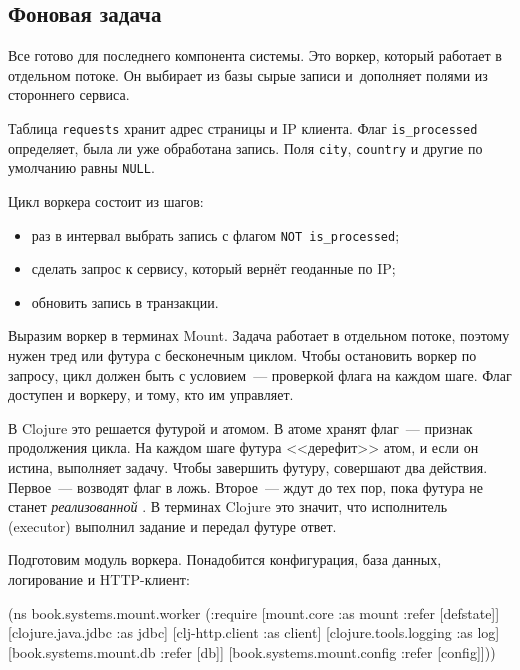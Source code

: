 \subsection{Фоновая задача}

\label{worker}

Все готово для последнего компонента системы. Это воркер, который работает в
отдельном потоке. Он выбирает из базы сырые записи и~дополняет полями из
стороннего сервиса.

Таблица \verb|requests| хранит адрес страницы и IP клиента. Флаг
\verb|is_processed| определяет, была ли уже обработана запись. Поля \verb|city|,
\verb|country| и другие по умолчанию равны \verb|NULL|.


Цикл воркера состоит из шагов:

\begin{itemize}

\item
  раз в интервал выбрать запись с флагом \verb|NOT is_processed|;

\item
  сделать запрос к сервису, который вернёт геоданные по IP;

\item
  обновить запись в транзакции.

\end{itemize}

Выразим воркер в терминах Mount. Задача работает в отдельном потоке, поэтому
нужен тред или футура с бесконечным циклом. Чтобы остановить воркер по запросу,
цикл должен быть с условием~--- проверкой флага на каждом шаге. Флаг доступен и
воркеру, и тому, кто им управляет.


В Clojure это решается футурой и атомом. В атоме хранят флаг~--- признак
продолжения цикла. На каждом шаге футура <<дерефит>> атом, и если он истина,
выполняет задачу. Чтобы завершить футуру, совершают два действия. Первое~---
возводят флаг в ложь. Второе~--- ждут до тех пор, пока футура не станет
\emph{реализованной} . В терминах Clojure это значит, что
исполнитель (executor) выполнил задание и передал футуре ответ.

Подготовим модуль воркера. Понадобится конфигурация, база данных, логирование и
HTTP-клиент:

\begin{english}
  \begin{clojure}
(ns book.systems.mount.worker
  (:require
   [mount.core :as mount :refer [defstate]]
   [clojure.java.jdbc :as jdbc]
   [clj-http.client :as client]
   [clojure.tools.logging :as log]
   [book.systems.mount.db :refer [db]]
   [book.systems.mount.config :refer [config]]))
  \end{clojure}
\end{english}

